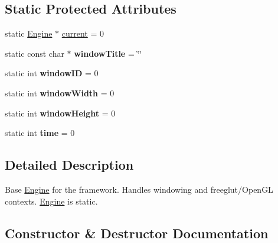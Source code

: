 \subsection*{Static Protected Attributes}
\begin{DoxyCompactItemize}
\item 
static \hyperlink{class_engine}{Engine} $\ast$ \hyperlink{class_engine_a74455645fff2e37cf3f6ad65a0709b3e}{current} = 0
\item 
static const char $\ast$ {\bfseries window\+Title} = \char`\"{}\char`\"{}\hypertarget{class_engine_afbe66082c7f1794516bff6e963e630b7}{}\label{class_engine_afbe66082c7f1794516bff6e963e630b7}

\item 
static int {\bfseries window\+ID} = 0\hypertarget{class_engine_a8319283c604ee6fce0cacae8fbd3ed33}{}\label{class_engine_a8319283c604ee6fce0cacae8fbd3ed33}

\item 
static int {\bfseries window\+Width} = 0\hypertarget{class_engine_a541d921b6b97e8756522958a58814344}{}\label{class_engine_a541d921b6b97e8756522958a58814344}

\item 
static int {\bfseries window\+Height} = 0\hypertarget{class_engine_a0ac480c63e98dd9b1fe4c4a3c9e6a7ca}{}\label{class_engine_a0ac480c63e98dd9b1fe4c4a3c9e6a7ca}

\item 
static int {\bfseries time} = 0\hypertarget{class_engine_a0c18d7f954663e37f58ed6f06c7040e0}{}\label{class_engine_a0c18d7f954663e37f58ed6f06c7040e0}

\end{DoxyCompactItemize}


\subsection{Detailed Description}
Base \hyperlink{class_engine}{Engine} for the framework. Handles windowing and freeglut/\+Open\+GL contexts. \hyperlink{class_engine}{Engine} is static. 

\subsection{Constructor \& Destructor Documentation}
